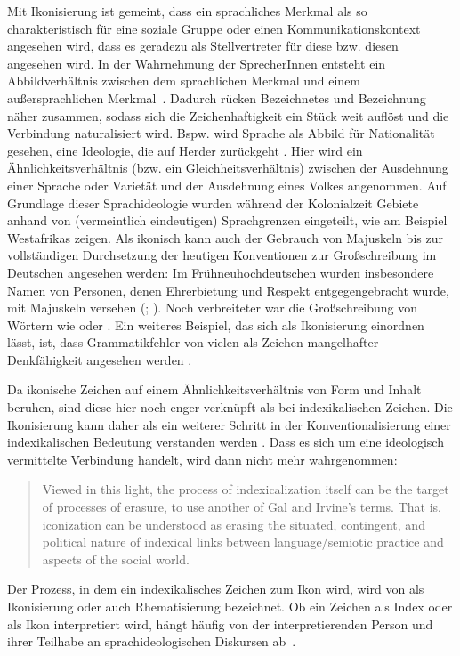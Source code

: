 Mit Ikonisierung ist gemeint, dass ein sprachliches Merkmal als so charakteristisch für eine soziale Gruppe oder einen Kommunikationskontext angesehen wird, dass es geradezu als Stellvertreter für diese bzw. diesen angesehen wird. 
In der Wahrnehmung der SprecherInnen entsteht ein Abbildverh{\"a}ltnis zwischen dem sprachlichen Merkmal und einem au{\ss}ersprachlichen Merkmal~\citep[s.][37]{Irvine2000}. 
Dadurch rücken Bezeichnetes und Bezeichnung näher zusammen, sodass sich die Zeichenhaftigkeit ein Stück weit auflöst und die Verbindung naturalisiert wird. 
Bspw. wird Sprache als Abbild für Nationalität gesehen, eine Ideologie, die auf Herder zurückgeht \citep[s.][60]{Irvine2000}. 
Hier wird ein Ähnlichkeitsverhältnis (bzw. ein Gleichheitsverhältnis) zwischen der Ausdehnung einer Sprache oder Varietät und der Ausdehnung eines Volkes angenommen. 
Auf Grundlage dieser Sprachideologie wurden während der Kolonialzeit Gebiete anhand von (vermeintlich eindeutigen) Sprachgrenzen eingeteilt, wie \citet[48--49]{Irvine2000} am Beispiel Westafrikas zeigen. 
Als ikonisch kann auch der Gebrauch von Majuskeln bis zur vollständigen Durchsetzung der heutigen Konventionen zur Großschreibung im Deutschen angesehen werden:
Im Frühneuhochdeutschen wurden insbesondere Namen von Personen, denen Ehrerbietung und Respekt entgegengebracht wurde, mit Majuskeln versehen (\citealp[s.][]{Ducker.i.Vorb.b}; \citealp[][73]{Bergmann.1999}). 
Noch verbreiteter war die Großschreibung von Wörtern wie  oder . 
Ein weiteres Beispiel, das sich als Ikonisierung einordnen lässt, ist, dass Grammatikfehler von vielen als Zeichen mangelhafter Denkfähigkeit angesehen werden \citep[s.][11]{Eisenberg1990b}. 

Da ikonische Zeichen auf einem {\"A}hnlichkeitsverh{\"a}ltnis von Form und Inhalt beruhen, sind diese hier noch enger verkn{\"u}pft als bei indexikalischen Zeichen. 
Die Ikonisierung kann daher als ein weiterer Schritt in der Konventionalisierung einer indexikalischen Bedeutung verstanden werden \citep[s.][86]{Jaffe.2016}. 
Dass es sich um eine ideologisch vermittelte Verbindung handelt, wird dann nicht mehr wahrgenommen: \begin{quote} Viewed in this light, the process of indexicalization itself can be the target of processes of {\glq}erasure,{\grq} to use another of Gal and Irvine's terms. That is, iconization can be understood as erasing the situated, contingent, and political nature of indexical links between language/semiotic practice and aspects of the social world.~\citep[87]{Jaffe.2016}\end{quote}
Der Prozess, in dem ein indexikalisches Zeichen zum Ikon wird, wird von \citet[123]{Gal.2016} als Ikonisierung oder auch Rhematisierung bezeichnet.
Ob ein Zeichen als Index oder als Ikon interpretiert wird, hängt häufig von der interpretierenden Person und ihrer Teilhabe an sprachideologischen Diskursen ab~\citep[s.][122]{Gal.2016}. 

